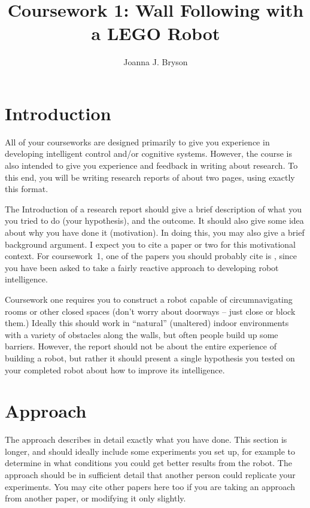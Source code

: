 \documentclass[a4paper,12pt]{article}
\title{Coursework 1:  Wall Following with a LEGO Robot}
\author{Joanna J. Bryson}
\begin{document}
\maketitle

\section{Introduction}
All of your courseworks are designed primarily to give you experience
in developing intelligent control and/or cognitive systems.  However,
the course is also intended to give you experience and feedback in
writing about research.  To this end, you will be writing research
reports of about two pages, using exactly this format.  

The Introduction of a research report should give a brief description
of what you you tried to do (your hypothesis), and the outcome.  It
should also give some idea about why you have done it (motivation). In
doing this, you may also give a brief background argument. I expect
you to cite a paper or two for this motivational context.  For
coursework~1, one of the papers you should probably cite is
\citet{BrooksAIJ91}, since you have been asked to take a fairly
reactive approach to developing robot intelligence.

Coursework one requires you to construct a robot capable of circumnavigating
rooms or other closed spaces (don't worry about doorways -- just close
or block them.)  Ideally this should work in ``natural'' (unaltered)
indoor environments with a variety of obstacles along the walls, but
often people build up some barriers.   However, the report should not
be about the entire experience of building a robot, but rather it
should present a single hypothesis you tested on your completed robot
about how to improve its intelligence.

\section{Approach}

The approach describes in detail exactly what you have done.  This
section is longer, and should ideally include some experiments you set
up, for example to determine in what conditions you could get better
results from the robot.  The approach should be in sufficient detail
that another person could replicate your experiments.  You may cite
other papers here too if you are taking an approach from another
paper, or modifying it only slightly.
\end{document}
